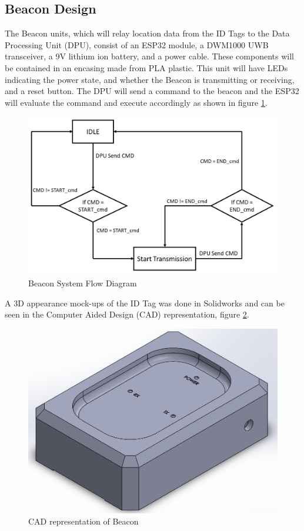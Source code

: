 \pagebreak
\subsection{Beacon Design}
The Beacon units, which will relay location data from the ID Tags to the Data Processing Unit (DPU), consist of an ESP32 module, a DWM1000 UWB transceiver, a 9V lithium ion battery, and a power cable. These components will be contained in an encasing made from PLA plastic. This unit will have LEDs indicating the power state, and whether the Beacon is transmitting or receiving, and a reset button. The DPU will send a command to the beacon and the ESP32 will evaluate the command and execute accordingly as shown in figure \ref{bcn_flow}.

\medskip
\begin{figure}[H]
\centering
    \includegraphics[scale=0.40]{./images/beacon_flow.png}
    \caption{Beacon System Flow Diagram}
    \label{bcn_flow}
\end{figure}
\medskip

A 3D appearance mock-ups of the ID Tag was done in Solidworks and can be seen in the Computer Aided Design (CAD) representation, figure \ref{Bcn_CAD}. 

\medskip
\begin{figure}[H]
\centering
    \includegraphics[scale=0.40]{./images/Beacon.png}
    \caption{CAD representation of Beacon}
    \label{Bcn_CAD}
\end{figure}



